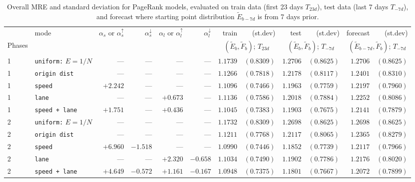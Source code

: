 \documentclass[sigconf, review]{acmart}
\begin{document}
\begin{table}[t]
\centering
\caption{Overall MRE and standard deviation for PageRank models, evaluated on train data  (first 23 days $T_{23d}$), test data (last 7 days $T_{-7d}$), and forecast where starting point distribution $\tilde E_{b-7d}$ is from 7 days prior.}
\label{tab:forecast-norm}
\setlength{\tabcolsep}{5pt}
\begin{tabular}{llrrrrrrrrrr}
\toprule
& mode & $\alpha_s$ or $\alpha_s^{\uparrow}$ & $\alpha_s^{\downarrow}$ & $\alpha_l$ or $\alpha_l^{\uparrow}$ & $\alpha_l^{\downarrow}$
  & train & (st.dev)
  & test  & (st.dev)
  & forecast & (st.dev) \\
\cmidrule(lr){7-8}\cmidrule(lr){9-10}\cmidrule(lr){11-12}
  Phases & &          &&&          & \multicolumn{2}{c}{$(\tilde{E}_{b},\tilde{F}_{b})$; $T_{23d}$} & \multicolumn{2}{c}{$(\tilde{E}_{b},\tilde{F}_{b})$; $T_{-7d}$} & \multicolumn{2}{c}{$(\tilde{E}_{b-7d},\tilde{F}_{b})$; $T_{-7d}$} \\
\midrule
1 & \texttt{uniform:} $E = 1/N$  &   ---    &  ---    &  ---    &   ---    & $1.1739$ & $(0.8309)$ & $1.2706$ & $(0.8625)$ & $1.2706$ & $(0.8625)$ \\
1 & \texttt{origin dist}    &   ---    &   ---    &  ---    &  ---    & $1.1266$ & $(0.7818)$ & $1.2178$ & $(0.8117)$ & $1.2401$ & $(0.8310)$ \\
1 & \texttt{speed}       & $+2.242$ &   ---    &  ---    &  ---    & $1.1096$ & $(0.7466)$ & $1.1963$ & $(0.7759)$ & $1.2197$ & $(0.7960)$ \\
1 & \texttt{lane}       &   ---    &  ---    &  $+0.673$    & --- & $1.1136$ & $(0.7586)$ & $1.2018$ & $(0.7884)$ & $1.2252$ & $(0.8086)$ \\
1 & \texttt{speed + lane} & $+1.751$ & --- & $+0.436$    &  ---    &  $1.1045$ & $(0.7383)$ & $1.1903$ & $(0.7675)$ & $1.2141$ & $(0.7879)$ \\
\midrule
2 & \texttt{uniform:} $E = 1/N$  &   ---    &   ---    &   ---    &   ---    & $1.1732$ & $(0.8309)$ & $1.2698$ & $(0.8625)$ & $1.2698$ & $(0.8625)$ \\
2 & \texttt{origin dist}    &   ---    &   ---    &   ---    &   ---    & $1.1211$ & $(0.7768)$ & $1.2117$ & $(0.8065)$ & $1.2365$ & $(0.8279)$ \\
2 & \texttt{speed}       & $+6.960$ & $-1.518$ &   ---    &   ---    & $1.0990$ & $(0.7446)$ & $1.1852$ & $(0.7739)$ & $1.2117$ & $(0.7966)$ \\
2 & \texttt{lane}       &   ---    &   ---    & $+2.320$ & $-0.658$ & $1.1034$ & $(0.7490)$ & $1.1902$ & $(0.7786)$ & $1.2176$ & $(0.8020)$ \\
\rowcolor{gray!15}2 & \texttt{speed + lane} & $+4.649$ & $-0.572$ & $+1.161$ & $-0.167$ & $1.0948$ & $(0.7375)$ & $1.1801$ & $(0.7667)$ & $1.2072$ & $(0.7899)$ \\
\bottomrule
\end{tabular}
\end{table}
\end{document}
